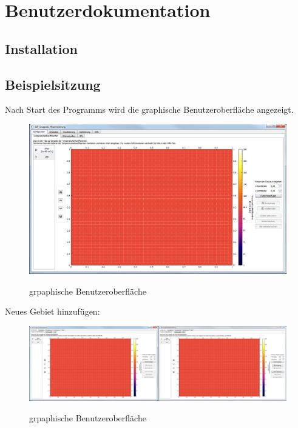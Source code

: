 \chapter{Benutzerdokumentation}

\section{Installation}

\section{Beispielsitzung}

Nach Start des Programms wird die graphische Benutzeroberfläche angezeigt.
\begin{figure}[H]
\centering
\includegraphics[scale=.5]{Benutzerdokumentation/StartAnzeige.png}\\
\caption{grpaphische Benutzeroberfläche}
\label{grpaphische Benutzeroberfläche}
\end{figure}

\newpage
\noindent
Neues Gebiet hinzufügen:
\begin{figure}[H]
\centering
\includegraphics[scale=.25]{Benutzerdokumentation/GebietHinzufuegen1.png}\\
\caption{grpaphische Benutzeroberfläche}
\label{grpaphische Benutzeroberfläche}
\end{figure}

